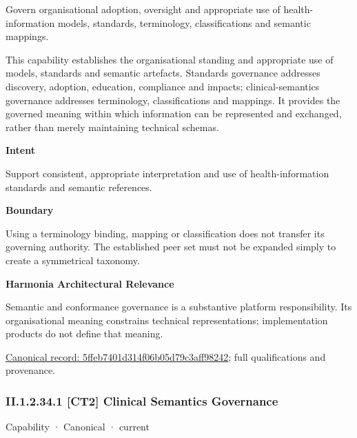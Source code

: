 Govern organisational adoption, oversight and appropriate use of health-information models, standards, terminology, classifications and semantic mappings.



This capability establishes the organisational standing and appropriate use of models, standards and semantic artefacts. Standards governance addresses discovery, adoption, education, compliance and impacts; clinical-semantics governance addresses terminology, classifications and mappings. It provides the governed meaning within which information can be represented and exchanged, rather than merely maintaining technical schemas.



\textbf{Intent}



Support consistent, appropriate interpretation and use of health-information standards and semantic references.



\textbf{Boundary}



Using a terminology binding, mapping or classification does not transfer its governing authority. The established peer set must not be expanded simply to create a symmetrical taxonomy.



\textbf{Harmonia Architectural Relevance}



Semantic and conformance governance is a substantive platform responsibility. Its organisational meaning constrains technical representations; implementation products do not define that meaning.


{\footnotesize \href{../../../../continuum/strategy/capability/5ffeb7401d314f06b05d79c3aff98242.md}{Canonical record: 5ffeb7401d314f06b05d79c3aff98242}; full qualifications and provenance.}\par
\subsubsection*{II.1.2.34.1 [CT2] Clinical Semantics Governance}
\label{navigation:II.1.2.34.1}

\label{element:5cc8319e1dde4c818cc248a47233b67b}
{\small Capability · Canonical · current}\par

